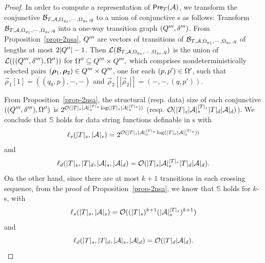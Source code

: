 \begin{proof}
In order to compute a representation of $\textsf{Pre}_{T}(\mathcal{A})$, we transform the conjunctive \SSA{} $\mathcal{B}_{T, \mathcal{A}, \Omega_{y_1}, \cdots, \Omega_{y_r},q}$ to a union of conjunctive \SA{}s as follows: Transform $\mathcal{B}_{T, \mathcal{A}, \Omega_{y_1}, \cdots, \Omega_{y_r}, q}$ into a one-way transition graph $(Q''',\delta''')$. From Proposition~\ref{prop-2nsa}, $Q'''$ are vectors of transitions of $\mathcal{B}_{T, \mathcal{A}, \Omega_{y_1}, \cdots, \Omega_{y_r}, q}$ of lengths at most $2|Q''|-1$. Then $\mathcal{L}(\mathcal{B}_{T, \mathcal{A}, \Omega_{y_1}, \cdots, \Omega_{y_r},q})$ is the union of $\mathcal{L}(((Q''',\delta'''), \Omega''))$ for $\Omega'' \subseteq Q''' \times Q''',$ which comprises nondeterministically selected pairs $(\vec{\rho}_1, \vec{\rho}_2) \in \controls''' \times \controls'''$, one for each $(p, p') \in \Omega'$, such that $\vec{\rho}_1[1] = ((q_0, p), -, -)$ and  $\vec{\rho}_2[|\vec{\rho}_2|] = (-, -, (q, p'))$.

From Proposition~\ref{prop-2nsa}, the structural (resp. data) size of each conjunctive \SA{} $((Q''',\delta'''), \Omega'')$
is  $ 2^{\mathcal{O}( |T|_s |\mathcal{A}|_s^{|T|_s} \log (|T|_s |\mathcal{A}|_s^{|T|_s}))}$ 
(resp. $ \mathcal{O}( |T|_s |\mathcal{A}|_s^{|T|_s} |T|_d |\mathcal{A}|_d )$). 
We conclude that 
$\mathbb{S}$\prerec{} holds for data string functions definable in \SSPT{}s with 
%
$$\ell_s(|T|_s, |\mathcal{A}|_s) = 2^{\mathcal{O}( |T|_s |\mathcal{A}|_s^{|T|_s} \log (|T|_s |\mathcal{A}|_s^{|T|_s}))}$$
 and 
$$\ell_d(|T|_s, |T|_d, |\mathcal{A}|_s, |\mathcal{A}|_d) = \mathcal{O}(|T|_s |\mathcal{A}|_s^{|T|_s} |T|_d |\mathcal{A}|_d).
$$
%
On the other hand, since there are at most $k+1$ transitions in each crossing sequence, from the proof of Proposition~\ref{prop-2nsa}, we know that $\mathbb{S}$\prerec{} holds for $k$-\SSPT{}s, with 
$$\ell_s(|T|_s, |\mathcal{A}|_s) = \mathcal{O}((|T|_s)^{k+1} (|\mathcal{A}|_s^{|T|_s})^{k+1})$$ 
and  
$$\ell_d(|T|_s, |T|_d, |\mathcal{A}|_s, |\mathcal{A}|_d) = \mathcal{O}(|T|_d |\mathcal{A}|_d).$$
\end{proof}



